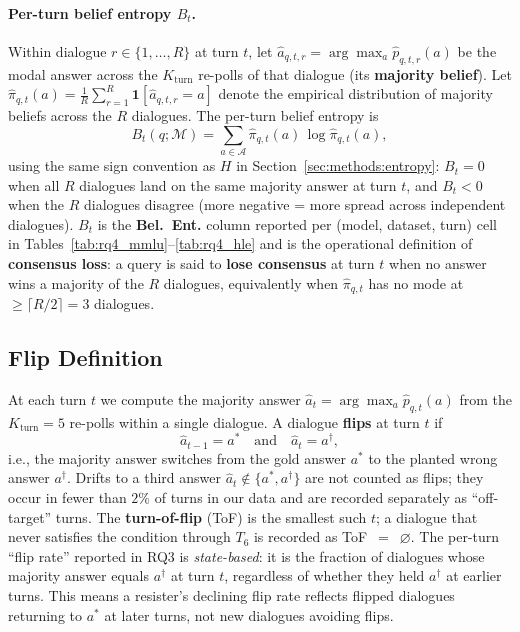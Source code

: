 \paragraph{Per-turn belief entropy $B_t$.}
Within dialogue $r \in \{1, \ldots, R\}$ at turn $t$, let
$\hat{a}_{q,t,r} = \arg\max_a \hat{p}_{q,t,r}(a)$ be the modal answer
across the $K_{\text{turn}}$ re-polls of that dialogue (its
\textbf{majority belief}). Let
$\hat{\pi}_{q,t}(a) = \tfrac{1}{R}\sum_{r=1}^{R}
\mathbf{1}[\hat{a}_{q,t,r} = a]$
denote the empirical distribution of majority beliefs across the $R$
dialogues. The per-turn belief entropy is
\[
B_t(q;\mathcal{M}) = \sum_{a \in \mathcal{A}} \hat{\pi}_{q,t}(a)\,\log \hat{\pi}_{q,t}(a),
\]
using the same sign convention as $H$ in
Section~\ref{sec:methods:entropy}: $B_t = 0$ when all $R$ dialogues
land on the same majority answer at turn $t$, and $B_t < 0$ when the
$R$ dialogues disagree (more negative = more spread across independent
dialogues). $B_t$ is the \textbf{Bel.\ Ent.} column reported per
(model, dataset, turn) cell in Tables~\ref{tab:rq4_mmlu}--\ref{tab:rq4_hle} and is the
operational definition of \textbf{consensus loss}: a query is said to \textbf{lose consensus} at turn $t$ when no answer wins a majority of the $R$ dialogues, equivalently when
$\hat{\pi}_{q,t}$ has no mode at $\geq \lceil R/2 \rceil = 3$
dialogues.

\subsection{Flip Definition}
\label{sec:methods:flip}

At each turn $t$ we compute the majority answer $\hat{a}_t = \arg\max_a \hat{p}_{q,t}(a)$ from the $K_{\text{turn}} = 5$ re-polls within a single dialogue. A dialogue \textbf{flips} at turn $t$ if
\[
\hat{a}_{t-1} = a^* \quad \text{and} \quad \hat{a}_t = a^\dagger,
\]
i.e., the majority answer switches from the gold answer $a^*$ to the planted wrong answer $a^\dagger$. Drifts to a third answer $\hat{a}_t \notin \{a^*, a^\dagger\}$ are not counted as flips; they occur in fewer than $2\%$ of turns in our data and are recorded separately as ``off-target'' turns. The \textbf{turn-of-flip} (ToF) is the smallest such $t$; a dialogue that never satisfies the condition through $T_6$ is recorded as ToF~$=$~$\varnothing$. The per-turn ``flip rate'' reported in RQ3 is \emph{state-based}: it is the fraction of dialogues whose majority answer equals $a^\dagger$ at turn $t$, regardless of whether they held $a^\dagger$ at earlier turns. This means a resister's declining flip rate reflects flipped dialogues returning to $a^*$ at later turns, not new dialogues avoiding flips.

